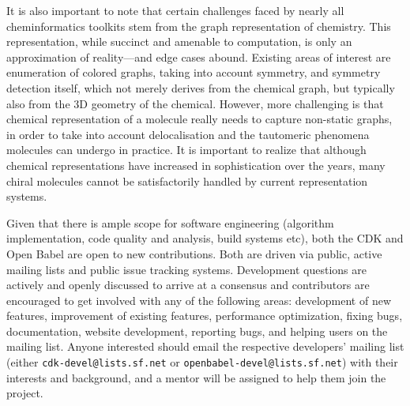 \documentclass{sig-alternate}
\begin{document}
It is also important to note that certain challenges faced by nearly
all cheminformatics toolkits stem from the graph representation of
chemistry. This representation, while succinct and amenable to
computation, is only an approximation of reality---and edge cases
abound. Existing areas of interest are enumeration of colored graphs,
taking into account symmetry, and symmetry detection itself, which not
merely derives from the chemical graph, but typically also from the 3D
geometry of the chemical. However, more challenging is that chemical
representation of a molecule really needs to capture non-static
graphs, in order to take into account delocalisation and the tautomeric
phenomena molecules can undergo in practice. It is important to
realize that although chemical representations have increased in
sophistication over the years, many chiral molecules cannot be
satisfactorily handled by current representation systems.


Given that there is ample scope for software engineering (algorithm
implementation, code quality and analysis, build systems etc), both
the CDK and Open Babel are open to new contributions. Both are driven
via public, active mailing lists and public issue tracking systems.
Development questions are actively and openly discussed to arrive at a
consensus and contributors are encouraged to get involved with any of
the following areas: development of new features, improvement of
existing features, performance optimization, fixing bugs,
documentation, website development, reporting bugs, and helping users
on the mailing list. Anyone interested should email the respective
developers' mailing list (either \texttt{cdk-devel@lists.sf.net} or
\texttt{openbabel-devel@lists.sf.net}) with their interests and
background, and a mentor will be assigned to help them join the
project.
%

%
\end{document}
